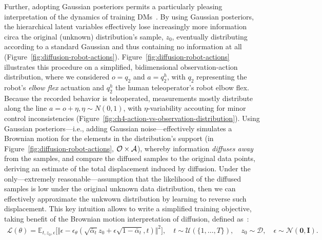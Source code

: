 Further, adopting Gaussian posteriors permits a particularly pleasing interpretation of the dynamics of training DMs~\citep{permenterInterpretingImprovingDiffusion2024}.
By using Gaussian posteriors, the hierarchical latent variables effectively lose increasingly more information circa the original (unknown) distribution's sample, \( z_0 \), eventually distributing according to a standard Gaussian and thus containing no information at all (Figure~\ref{fig:diffusion-robot-actions}).
Figure~\ref{fig:diffusion-robot-actions} illustrates this procedure on a simplified, bidimensional observation-action distribution, where we considered \( o=q_2\) and \( a=q^h_2\), with \( q_2 \) representing the robot's \emph{elbow flex} actuation and \( q^h_2 \) the human teleoperator's robot elbow flex. 
Because the recorded behavior is teleoperated, measurements mostly distribute along the line \( a = o + \eta, \eta \sim N(0,1) \), with \( \eta \)-variability accouting for minor control inconsistencies (Figure~\ref{fig:ch4-action-vs-observation-distribution}).
Using Gaussian posteriors---i.e., adding Gaussian noise---effectively simulates a Brownian motion for the elements in the distribution's support (in Figure~\ref{fig:diffusion-robot-actions}, \( \mathcal O \times \mathcal A \)), whereby information \emph{diffuses away} from the samples, and compare the diffused samples to the original data points, deriving an estimate of the total displacement induced by diffusion.
Under the only---extremely reasonable---assumption that the likelihood of the diffused samples is low under the original unknown data distribution, then we can effectively approximate the unkwown distribution by learning to reverse such displacement.
This key intuition allows to write a simplified training objective, taking benefit of the Brownian motion interpretation of diffusion, defined as~\citet{hoDenoisingDiffusionProbabilistic2020}:
\begin{align}\label{eq:diffusion-simplified-loss}
    \mathcal L(\theta) = \mathbb{E}_{t, z_0, \epsilon} \big[
        \Vert \epsilon - \epsilon_\theta(\sqrt{\bar \alpha_t} z_0 + \epsilon \sqrt{1 - \bar \alpha_t}, t) \Vert^2 \big], \quad t \sim \mathcal{U}(\{1,\dots,T\}), \quad
        z_0 \sim \mathcal{D}, \quad
        \epsilon \sim \mathcal{N}(\mathbf{0},\mathbf{I}).
\end{align}

